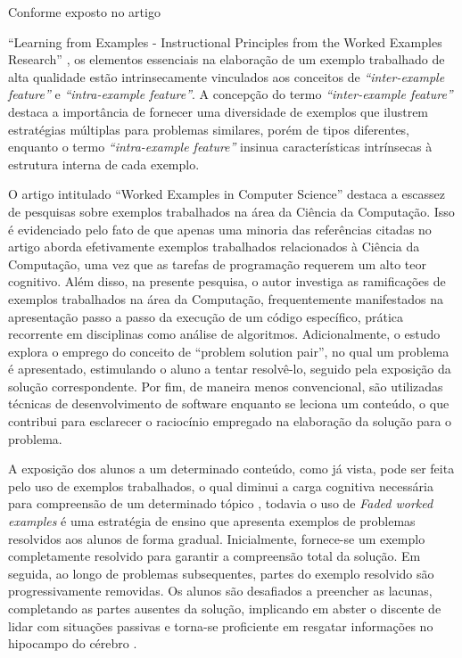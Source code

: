 Conforme exposto no artigo {``Learning from Examples - Instructional Principles from the Worked Examples Research'' \cite{Robert.Atkinson-etal:2000}, os elementos essenciais na elaboração de um exemplo trabalhado de alta qualidade estão intrinsecamente vinculados aos conceitos de \textit{``inter-example feature''} e \textit{``intra-example feature''}. A concepção do termo \textit{``inter-example feature''} destaca a importância de fornecer uma diversidade de exemplos que ilustrem estratégias múltiplas para problemas similares, porém de tipos diferentes, enquanto o termo \textit{``intra-example feature''} insinua características intrínsecas à estrutura interna de cada exemplo. 

O artigo intitulado ``Worked Examples in Computer Science'' \cite{Skudder-LuxtonReilly:2014} destaca a escassez de pesquisas sobre exemplos trabalhados na área da Ciência da Computação. Isso é evidenciado pelo fato de que apenas uma minoria das referências citadas no artigo aborda efetivamente exemplos trabalhados relacionados à Ciência da Computação, uma vez que as tarefas de programação requerem um alto teor cognitivo. Além disso, na presente pesquisa, o autor investiga as ramificações de exemplos trabalhados na área da Computação, frequentemente manifestados na apresentação passo a passo da execução de um código específico, prática recorrente em disciplinas como análise de algoritmos. Adicionalmente, o estudo explora o emprego do conceito de ``problem solution pair'', no qual um problema é apresentado, estimulando o aluno a tentar resolvê-lo, seguido pela exposição da solução correspondente. Por fim, de maneira menos convencional, são utilizadas técnicas de desenvolvimento de software enquanto se leciona um conteúdo, o que contribui para esclarecer o raciocínio empregado na elaboração da solução para o problema.

A exposição dos alunos a um determinado conteúdo, como já vista, pode ser feita pelo uso de exemplos trabalhados, o qual diminui a carga cognitiva necessária para compreensão de um determinado tópico \cite{Robert.Atkinson-etal:2000}, todavia o uso de \textit{Faded worked examples} é uma estratégia de ensino que apresenta exemplos de problemas resolvidos aos alunos de forma gradual. Inicialmente, fornece-se um exemplo completamente resolvido para garantir a compreensão total da solução. Em seguida, ao longo de problemas subsequentes, partes do exemplo resolvido são progressivamente removidas. Os alunos são desafiados a preencher as lacunas, completando as partes ausentes da solução, implicando em abster o discente de lidar com situações passivas e torna-se proficiente em resgatar informações no hipocampo do cérebro \cite{Skudder-LuxtonReilly:2014}.

}
